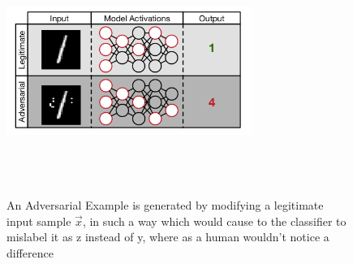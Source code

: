 \documentclass[grad,lot,lof,11pt,oneside,onehalfspace]{RUthesis}
\begin{document}
\begin{figure}[h]
\centering
\includegraphics[width=8cm, height=8cm]{"Images/Chapter 2/AdversarialExample"}
\caption{An Adversarial Example is generated by modifying a legitimate input sample $\vec{x}$, in such a way which would cause to the classifier to mislabel it as z instead of y, where as a human wouldn't notice a difference \cite{papernot_transferability_2016}}
\label{fig:AdversarialExample}
\end{figure}
\end{document}

